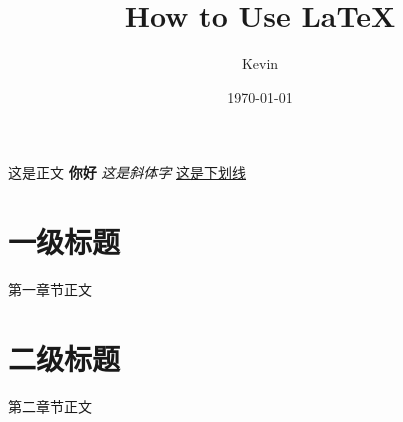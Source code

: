 \documentclass[UTF8]{ctexart}
\title{How to Use LaTeX}
\author{Kevin}
\date{\today}
\begin{document}
\maketitle
这是正文
\textbf{你好}
\textit{这是斜体字}
\underline{这是下划线}
\section{一级标题}
第一章节正文
\section{二级标题}
第二章节正文
\end{document}
